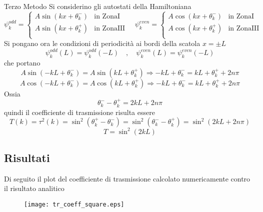\begin{paragraph}{Terzo Metodo}
Si considerino gli autostati della Hamiltoniana
$$ \psi_k^{odd} = \begin{cases}
    A\sin(kx + \theta^-_k) & \mbox{in ZonaI} \\
    A\sin(kx + \theta^+_k) & \mbox{in ZonaIII} \\
\end{cases}
\quad
\psi_k^{even} = \begin{cases}
    A\cos(kx + \theta^-_k) & \mbox{in ZonaI} \\
    A\cos(kx + \theta^+_k) & \mbox{in ZonaIII} \\
\end{cases}
$$
Si pongano ora le condizioni di periodicità ai bordi della scatola $x = \pm L$
    $$  \psi_k^{odd}(L) = \psi_k^{odd}(-L) \quad,\quad \psi_k^{even}(L) = \psi_k^{even}(-L)$$
che portano
$$ A\sin(-kL + \theta^-_k) = A\sin(kL + \theta^+_k) \Rightarrow -kL + \theta^-_k = kL + \theta^+_k + 2n\pi $$
$$ A\cos(-kL + \theta^-_k) = A\cos(kL + \theta^+_k) \Rightarrow -kL + \theta^-_k = kL + \theta^+_k + 2n\pi $$
Ossia
      $$ \theta^-_k - \theta^+_k = 2kL + 2n\pi $$
quindi il coefficiente di trasmissione risulta essere
    $$ T(k) = \tau^2(k) = \sin^2(\theta_k^+ - \theta_k^-) = \sin^2(\theta_k^- - \theta_k^+) = \sin^2(2kL + 2n\pi) $$
    $$ T = \sin^2(2kL) $$
\end{paragraph}

%
\subsection*{Risultati}
Di seguito il plot del coefficiente di trasmissione calcolato numericamente contro
il risultato analitico

\begin{figure}[h]
  \texttt{[image: tr\_coeff\_square.eps]}
\end{figure}
